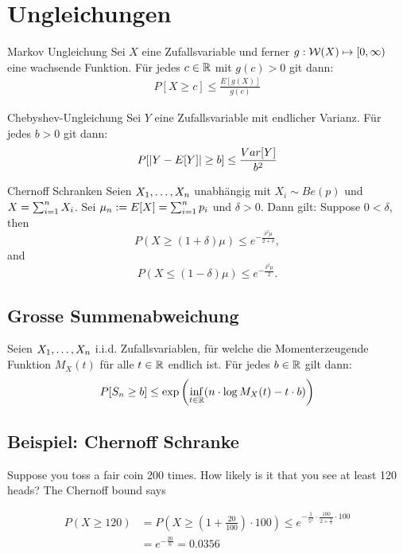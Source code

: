 \section{Ungleichungen}
\begin{definition}{Markov Ungleichung}
  Sei $X$ eine Zufallsvariable und ferner $g : \mathcal{W} (X) \mapsto [0, \infty)$ eine
  wachsende Funktion. Für jedes $c \in \mathbb{R}$ mit $g (c) > 0$ git dann:
  \begin{align*}
    P[X \geq c] \leq \frac{E[g (X)]}{g (c)}
  \end{align*}
\end{definition}
\begin{definition}{Chebyshev-Ungleichung}
  Sei $Y$ eine Zufallsvariable mit endlicher Varianz. Für jedes $b > 0$ git dann:
  \begin{align*}
    P[\abs{Y - E[Y]} \geq b] \leq \frac{Var[Y]}{b^2}
  \end{align*}
\end{definition}
\begin{definition}{Chernoff Schranken}
  Seien $X_1, \dots, X_n$ unabhängig mit $X_i \sim Be (p)$ und $X = \sum_{i = 1}^n X_i$.
  Sei $\mu_n := E[X] = \sum_{i = 1}^n p_i$ und $\delta > 0$. Dann gilt:
  Suppose $0 < \delta$, then
  \[ P(X \geq (1 + \delta)\mu) \leq e^{-\frac{\delta^2\mu}{2+\delta}}, \]
  and
  \[ P(X \leq (1 - \delta)\mu) \leq e^{-\frac{\delta^2\mu}{2}}. \]
\end{definition}

\subsection{Grosse Summenabweichung}
Seien $X_1, \dots, X_n$ i.i.d. Zufallsvariablen, für welche die
Momenterzeugende Funktion $M_X (t)$ für alle $t \in \mathbb{R}$ endlich ist. Für jedes
$b \in \mathbb{R}$ gilt dann:
\begin{align*}
  P[S_n \geq b] \leq \exp \left( \inf_{t \in \mathbb{R}}  ( n \cdot \log M_X (t) - t \cdot b ) \right)
\end{align*}


\BoxStart{}
\subsection{Beispiel: Chernoff Schranke}
Suppose you toss a fair coin 200 times. How likely is it that you see
at least 120 heads?
The Chernoff bound says

\begin{align*}
  P(X \geq 120) & = P(X \geq (1 + \frac{20}{100}) \cdot 100) \leq e^{-\frac{1}{5^2} \cdot \frac{100}{2+\frac{1}{5}} \cdot 100} \\
                & = e^{-\frac{20}{6}} = 0.0356
\end{align*}

